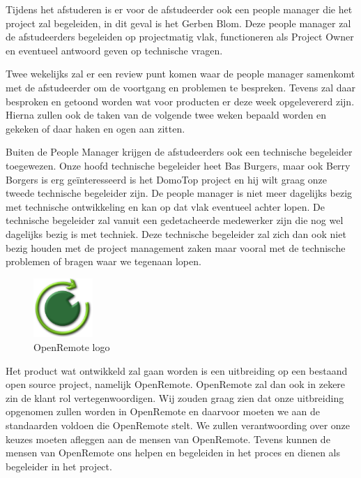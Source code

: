 \documentclass[]{article}
\begin{document}
Tijdens het afstuderen is er voor de afstudeerder ook een people manager
die het project zal begeleiden, in dit geval is het Gerben Blom. Deze
people manager zal de afstudeerders begeleiden op projectmatig vlak,
functioneren als Project Owner en eventueel antwoord geven op technische
vragen.

Twee wekelijks zal er een review punt komen waar de people manager
samenkomt met de afstudeerder om de voortgang en problemen te bespreken.
Tevens zal daar besproken en getoond worden wat voor producten er deze week
opgelevererd zijn. Hierna zullen ook de taken van de volgende twee weken
bepaald worden en gekeken of daar haken en ogen aan zitten.

Buiten de People Manager krijgen de afstudeerders ook een technische
begeleider toegewezen. Onze hoofd technische begeleider heet Bas Burgers,
maar ook Berry Borgers is erg geïnteresseerd is het DomoTop project en hij
wilt graag onze tweede technische begeleider zijn. De people manager is
niet meer dagelijks bezig met technische ontwikkeling en kan op dat vlak
eventueel achter lopen. De technische begeleider zal vanuit een
gedetacheerde medewerker zijn die nog wel dagelijks bezig is met techniek.
Deze technische begeleider zal zich dan ook niet bezig houden met de
project management zaken maar vooral met de technische problemen of bragen
waar we tegenaan lopen.

\begin{figure}
  \begin{center}
    \includegraphics[width=0.20\textwidth]{openremote.pdf}
  \end{center}
  \caption{OpenRemote logo}
\end{figure}

Het product wat ontwikkeld zal gaan worden is een uitbreiding op een
bestaand open source project, namelijk OpenRemote. OpenRemote zal dan ook
in zekere zin de klant rol vertegenwoordigen. Wij zouden graag zien dat
onze uitbreiding opgenomen zullen worden in OpenRemote en daarvoor moeten
we aan de standaarden voldoen die OpenRemote stelt. We zullen
verantwoording over onze keuzes moeten afleggen aan de mensen van
OpenRemote. Tevens kunnen de mensen van OpenRemote ons helpen en begeleiden
in het proces en dienen als begeleider in het project.
\end{document}
